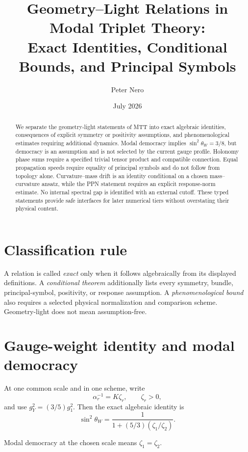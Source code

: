 \documentclass[11pt]{article}
\title{Geometry--Light Relations in Modal Triplet Theory:\\Exact Identities, Conditional Bounds, and Principal Symbols}
\author{Peter Nero}
\date{July 2026}
\begin{document}
\maketitle

\begin{abstract}
We separate the geometry-light statements of MTT into exact algebraic
identities, consequences of explicit symmetry or positivity assumptions, and
phenomenological estimates requiring additional dynamics. Modal democracy
implies $\sin^2\theta_W=3/8$, but democracy is an assumption and is not selected
by the current gauge profile. Holonomy phase sums require a specified trivial
tensor product and compatible connection. Equal propagation speeds require
equality of principal symbols and do not follow from topology alone.
Curvature--mass drift is an identity conditional on a chosen mass--curvature
ansatz, while the PPN statement requires an explicit response-norm estimate.
No internal spectral gap is identified with an external cutoff. These typed
statements provide safe interfaces for later numerical tiers without
overstating their physical content.
\end{abstract}

\section{Classification rule}

A relation is called \emph{exact} only when it follows algebraically from its
displayed definitions. A \emph{conditional theorem} additionally lists every
symmetry, bundle, principal-symbol, positivity, or response assumption. A
\emph{phenomenological bound} also requires a selected physical normalization
and comparison scheme. Geometry-light does not mean assumption-free.

\section{Gauge-weight identity and modal democracy}

At one common scale and in one scheme, write
\[
\alpha_r^{-1}=K\zeta_r,
\qquad \zeta_r>0,
\]
and use $g_Y^2=(3/5)g_1^2$. Then the exact algebraic identity is
\begin{equation}
\boxed{\sin^2\theta_W
=\frac{1}{1+(5/3)(\zeta_1/\zeta_2)}.}
\label{eq:weak-general}
\end{equation}

\begin{definition}
Modal democracy at the chosen scale means $\zeta_1=\zeta_2$.
\end{definition}
\end{document}
